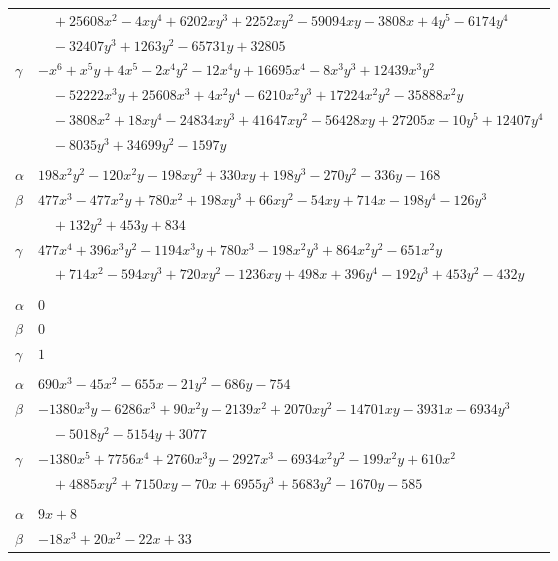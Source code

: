 \documentclass[11pt]{article}
\begin{document}
\begin{longtable}{@{}ll@{}}
 & $\quad +25608x^{2}-4xy^{4}+6202xy^{3}+2252xy^{2}-59094xy-3808x+4y^{5}-6174y^{4}$\\
 & $\quad -32407y^{3}+1263y^{2}-65731y+32805$\\
$\gamma$ & $-x^{6}+x^{5}y+4x^{5}-2x^{4}y^{2}-12x^{4}y+16695x^{4}-8x^{3}y^{3}+12439x^{3}y^{2}$\\
 & $\quad -52222x^{3}y+25608x^{3}+4x^{2}y^{4}-6210x^{2}y^{3}+17224x^{2}y^{2}-35888x^{2}y$\\
 & $\quad -3808x^{2}+18xy^{4}-24834xy^{3}+41647xy^{2}-56428xy+27205x-10y^{5}+12407y^{4}$\\
 & $\quad -8035y^{3}+34699y^{2}-1597y$\\
\addlinespace[3pt]
\multicolumn{2}{@{}l}{$\{i,j\}=\{33,42\}$, $k_{ij}=2^{3}\cdot 3\cdot 7$}\\
$\alpha$ & $198x^{2}y^{2}-120x^{2}y-198xy^{2}+330xy+198y^{3}-270y^{2}-336y-168$\\
$\beta$ & $477x^{3}-477x^{2}y+780x^{2}+198xy^{3}+66xy^{2}-54xy+714x-198y^{4}-126y^{3}$\\
 & $\quad +132y^{2}+453y+834$\\
$\gamma$ & $477x^{4}+396x^{3}y^{2}-1194x^{3}y+780x^{3}-198x^{2}y^{3}+864x^{2}y^{2}-651x^{2}y$\\
 & $\quad +714x^{2}-594xy^{3}+720xy^{2}-1236xy+498x+396y^{4}-192y^{3}+453y^{2}-432y$\\
\addlinespace[3pt]
\multicolumn{2}{@{}l}{$\{i,j\}=\{33,90\}$, $k_{ij}=2$}\\
$\alpha$ & $0$\\
$\beta$ & $0$\\
$\gamma$ & $1$\\
\addlinespace[3pt]
\multicolumn{2}{@{}l}{$\{i,j\}=\{34,35\}$, $k_{ij}=13^{2}$}\\
$\alpha$ & $690x^{3}-45x^{2}-655x-21y^{2}-686y-754$\\
$\beta$ & $-1380x^{3}y-6286x^{3}+90x^{2}y-2139x^{2}+2070xy^{2}-14701xy-3931x-6934y^{3}$\\
 & $\quad -5018y^{2}-5154y+3077$\\
$\gamma$ & $-1380x^{5}+7756x^{4}+2760x^{3}y-2927x^{3}-6934x^{2}y^{2}-199x^{2}y+610x^{2}$\\
 & $\quad +4885xy^{2}+7150xy-70x+6955y^{3}+5683y^{2}-1670y-585$\\
\addlinespace[3pt]
\multicolumn{2}{@{}l}{$\{i,j\}=\{35,36\}$, $k_{ij}=1$}\\
$\alpha$ & $9x+8$\\
$\beta$ & $-18x^{3}+20x^{2}-22x+33$\\

\end{longtable}
\end{document}
